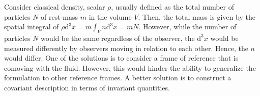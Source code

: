 Consider classical density, scalar $\rho$, usually defined as the 
total number of particles $N$ of rest-mass $m$ in the volume $V$. 
Then, the total mass is given by the 
spatial integral of $\rho \text{d}^3x = m\int_V n \text{d}^3 x = mN$. 
However, while the number of particles $N$ would be the same regardless of the observer, 
the $\text{d}^3x$ would be measured differently by observers moving in relation to each other. 
Hence, the $n$ would differ. 
One of the solutions is to consider a frame of reference that is comoving with the fluid.
However, this would hinder the ability to generalize the formulation to other reference frames.
A better solution is to construct a covariant description in terms of invariant quantities.
%
%
%

